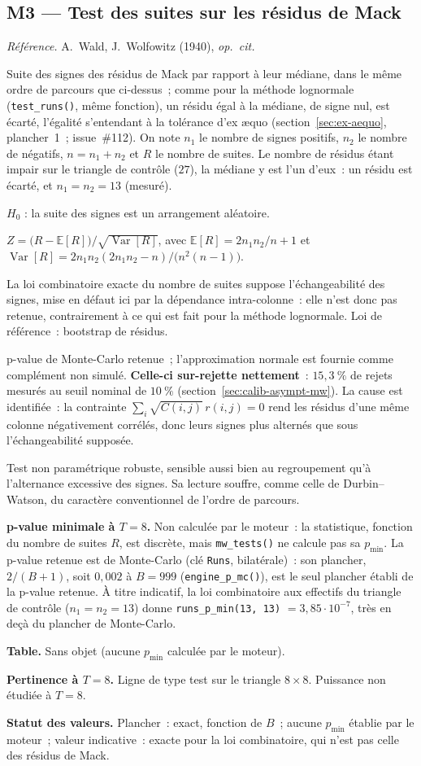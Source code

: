 \documentclass[a4paper,11pt]{article}
\newcommand{\code}[1]{\texttt{\small #1}}
\newcommand{\refl}[1]{{\small\textcolor{maincolor!70!black}{\textit{Référence.} #1}}\par\smallskip}
\newcounter{ficheid}
\newenvironment{fiche}[1]{%
  \stepcounter{ficheid}%
  \phantomsection
  \subsection{#1}%
  \label{fiche:\theficheid}%
}{%
  \end{description}\vspace{0.5em}%
}
\newcommand{\Cadre}{%
  \begin{description}[leftmargin=0pt, style=unboxed, itemsep=3pt, topsep=3pt, parsep=2pt]%
  \item[\textcolor{financeblue}{\textbf{1. Cadre, notations et hypothèses de validité (non testées).}}]}
\newcommand{\Hzero}{\item[\textcolor{financeblue}{\textbf{2. Hypothèse nulle.}}]}
\newcommand{\Stat}{\item[\textcolor{financeblue}{\textbf{3. Statistique de test.}}]}
\newcommand{\Loi}{\item[\textcolor{financeblue}{\textbf{4. Loi sous $H_0$.}}]}
\newcommand{\Pval}{\item[\textcolor{financeblue}{\textbf{5. p-value.}}]}
\newcommand{\Usage}{\item[\textcolor{financeblue}{\textbf{6. Usage et limites.}}]}
\newcommand{\Pertinence}{\item[\textcolor{financeblue}{\textbf{7. Pertinence et puissance à faible $T$.}}]}
\begin{document}
\begin{fiche}{M3 --- Test des suites sur les résidus de Mack}
\label{mw:m3runs}
\refl{A.~Wald, J.~Wolfowitz (1940), \emph{op.\ cit.}}
\Cadre
Suite des signes des résidus de Mack par rapport à leur médiane, dans le même
ordre de parcours que ci-dessus~; comme pour la méthode lognormale
(\code{test\_runs()}, même fonction), un résidu égal à la médiane, de signe nul, est écarté,
l'égalité s'entendant à la tolérance d'ex \ae quo (section~\ref{sec:ex-aequo}, plancher~1~;
issue~\#112). On
note $n_1$ le nombre de signes positifs, $n_2$ le nombre de négatifs,
$n = n_1 + n_2$ et $R$ le nombre de suites. Le nombre de résidus étant impair
sur le triangle de contrôle ($27$), la médiane y est l'un d'eux~: un résidu est
écarté, et $n_1 = n_2 = 13$ (mesuré).
\Hzero
$H_0$ : la suite des signes est un arrangement aléatoire.
\Stat
$Z = \big(R - \mathbb{E}[R]\big)/\sqrt{\operatorname{Var}[R]}$, avec
$\mathbb{E}[R] = 2n_1n_2/n + 1$ et
$\operatorname{Var}[R] = 2n_1n_2(2n_1n_2-n)/\big(n^2(n-1)\big)$.
\Loi
La loi combinatoire exacte du nombre de suites suppose l'échangeabilité des
signes, mise en défaut ici par la dépendance intra-colonne~: elle n'est donc pas
retenue, contrairement à ce qui est fait pour la méthode lognormale. Loi de
référence~: bootstrap de résidus.
\Pval
p-value de Monte-Carlo retenue~; l'approximation normale est fournie comme
complément non simulé. \textbf{Celle-ci sur-rejette nettement}~: $15{,}3~\%$ de
rejets mesurés au seuil nominal de $10~\%$ (section~\ref{sec:calib-asympt-mw}).
La cause est identifiée~: la contrainte
$\sum_i \sqrt{C(i,j)}\,r(i,j) = 0$ rend les résidus d'une même colonne
négativement corrélés, donc leurs signes plus alternés que sous l'échangeabilité
supposée.
\Usage
Test non paramétrique robuste, sensible aussi bien au regroupement qu'à
l'alternance excessive des signes. Sa lecture souffre, comme celle de
Durbin--Watson, du caractère conventionnel de l'ordre de parcours.
\Pertinence
\textbf{p-value minimale à $T = 8$.} Non calculée par le moteur~: la statistique, fonction du nombre de suites $R$, est discrète, mais \code{mw\_tests()} ne calcule pas sa $p_{\min}$. La p-value retenue est de Monte-Carlo (clé \code{Runs}, bilatérale)~: son plancher, $2/(B+1)$, soit $0{,}002$ à $B = 999$ (\code{engine\_p\_mc()}), est le seul plancher établi de la p-value retenue. À titre indicatif, la loi combinatoire aux effectifs du triangle de contrôle ($n_1 = n_2 = 13$) donne \code{runs\_p\_min(13, 13)} $= 3{,}85\cdot 10^{-7}$, très en deçà du plancher de Monte-Carlo.

\textbf{Table.} Sans objet (aucune $p_{\min}$ calculée par le moteur).

\textbf{Pertinence à $T = 8$.} Ligne de type test sur le triangle $8\times 8$. Puissance non étudiée à $T = 8$.

\textbf{Statut des valeurs.} Plancher~: exact, fonction de $B$~; aucune $p_{\min}$ établie par le moteur~; valeur indicative~: exacte pour la loi combinatoire, qui n'est pas celle des résidus de Mack.
\end{fiche}
\end{document}
